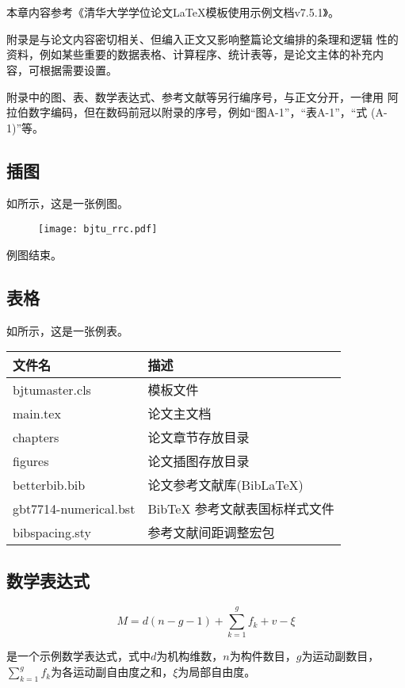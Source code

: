 \chapter{{\protect\\} \hspace{-13pt}{[补充内容]}}

本章内容参考《清华大学学位论文\LaTeX{}模板使用示例文档\cite{TUN2025LaTeXThesisTe}v7.5.1》。

附录是与论文内容密切相关、但编入正文又影响整篇论文编排的条理和逻辑
性的资料，例如某些重要的数据表格、计算程序、统计表等，是论文主体的补充内
容，可根据需要设置。

附录中的图、表、数学表达式、参考文献等另行编序号，与正文分开，一律用
阿拉伯数字编码，但在数码前冠以附录的序号，例如“图A-1”，“表A-1”，“式
(A-1)”等。

\section{插图}
如所示，这是一张例图。

\begin{figure}[htbp]
  \centering
  \texttt{[image: bjtu\_rrc.pdf]}
  \label{fig:app}
\end{figure}

\noindent 例图结束。

\section{表格}
如所示，这是一张例表。

\begin{table}[H]\wuhao
  \centering
  \renewcommand\arraystretch{0.8} %
  \begin{tabular}{ll}
    \toprule
    文件名          & 描述                         \\
    \midrule
    bjtumaster.cls   & 模板文件                     \\
    main.tex & 论文主文档    \\
    chapters & 论文章节存放目录  \\
    figures & 论文插图存放目录        \\
    betterbib.bib & 论文参考文献库(BibLaTeX)        \\
    gbt7714-numerical.bst & BibTeX 参考文献表国标样式文件    \\
    bibspacing.sty & 参考文献间距调整宏包  \\
    \bottomrule
  \end{tabular}
  \label{tab:app}
\end{table}

\section{数学表达式}

\begin{equation}\label{示例}
    M=d\left( n-g-1 \right) +\sum_{k=1}^g{f_k}+v-\xi 
\end{equation}

是一个示例数学表达式，式中$d$为机构维数，$n$为构件数目，$g$为运动副数目，$\sum_{k=1}^g{f_k}$为各运动副自由度之和，$\xi$为局部自由度。


